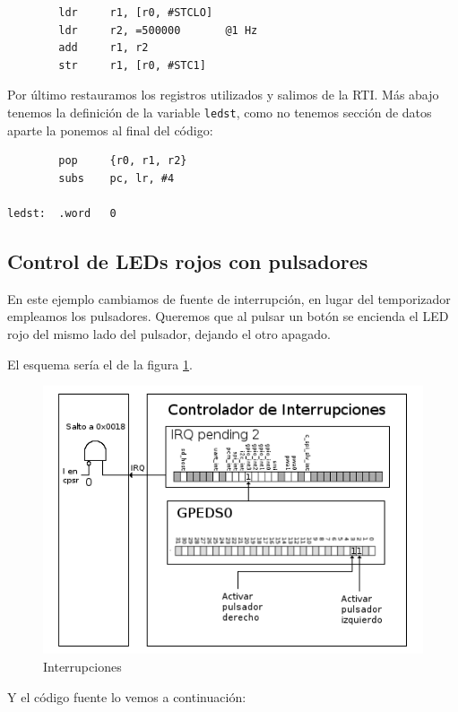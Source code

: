 \begin{lstlisting}
        ldr     r1, [r0, #STCLO]
        ldr     r2, =500000       @1 Hz
        add     r1, r2
        str     r1, [r0, #STC1]
\end{lstlisting}

Por último restauramos los registros utilizados y salimos de la RTI. Más abajo tenemos la
definición de la variable {\tt ledst}, como no tenemos sección de datos aparte la ponemos
al final del código:

\begin{lstlisting}
        pop     {r0, r1, r2}
        subs    pc, lr, #4

ledst:  .word   0
\end{lstlisting}

\subsection{Control de LEDs rojos con pulsadores}

En este ejemplo cambiamos de fuente de interrupción, en lugar del temporizador empleamos
los pulsadores. Queremos que al pulsar un botón se encienda el LED rojo del mismo lado del
pulsador, dejando el otro apagado.

El esquema sería el de la figura \ref{fig:inter3}.

\begin{figure}[h]
  \centering
    \includegraphics[width=14cm]{graphs/inter3.png}
  \caption{Interrupciones}
  \label{fig:inter3}
\end{figure}

Y el código fuente lo vemos a continuación:

